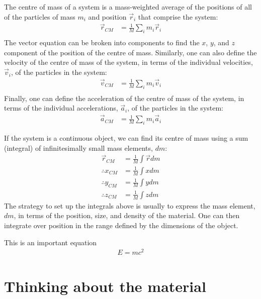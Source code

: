 \begin{chapterSummary}
{The centre of mass of a system is a mass-weighted average of the positions of all of the particles of mass $m_i$ and position $\vec r_i$ that comprise the system:
\begin{align*}
\vec r_{CM} &=\frac{1}{M}\sum_i m_i\vec r_i\\
\end{align*}
The vector equation can be broken into components to find the $x$, $y$, and $z$ component of the position of the centre of mass. Similarly, one can also define the velocity of the centre of mass of the system, in terms of the individual velocities, $\vec v_i$, of the particles in the system:
\begin{align*}
\vec v_{CM} &= \frac{1}{M}\sum_i m_i\vec v_i\\
\end{align*}
Finally, one can define the acceleration of the centre of mass of the system, in terms of the individual accelerations, $\vec a_i$, of the particles in the system:
\begin{align*}
\vec a_{CM} &=  \frac{1}{M}\sum_i m_i\vec a_i
\end{align*}

If the system is a continuous object, we can find its centre of mass using a sum (integral) of infinitesimally small mass elements, $dm$:
\begin{align*}
\vec r_{CM} &=\frac{1}{M}\int \vec r dm\\
\therefore x_{CM} &= \frac{1}{M}\int x dm\\
\therefore y_{CM} &=  \frac{1}{M}\int y dm\\
\therefore z_{CM} &=  \frac{1}{M}\int z dm
\end{align*}
The strategy to set up the integrals above is usually to express the mass element, $dm$, in terms of the position, size, and density of the material. One can then integrate over position in the range defined by the dimensions of the object.
}
\end{chapterSummary}

\newpage
\begin{importantEquations}
This is an important equation
\begin{align*}
E = mc^2
\end{align*}

\end{importantEquations}


\newpage
\section{Thinking about the material}
